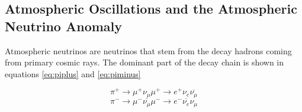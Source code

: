 
\subsection{Atmospheric Oscillations and the Atmospheric Neutrino Anomaly}
Atmospheric neutrinos are neutrinos that stem from the decay hadrons coming from primary cosmic rays. The dominant part of the decay chain is shown in equations  \ref{eq:piplus} and \ref{eq:piminus}

\begin{equation}
\label{eq:piplus}
\pi^{+} \rightarrow \mu^{+} \nu_{\mu} \mu^{+} \rightarrow e^{+} \nu_{e} \overline{\nu_{\mu}}
\end{equation}
\begin{equation}
\label{eq:piminus}
\pi^{-} \rightarrow \mu^{-} \overline{\nu_{\mu}} \mu^{-} \rightarrow e^{-} \overline{\nu_{e}} \nu_{\mu}
\end{equation}


